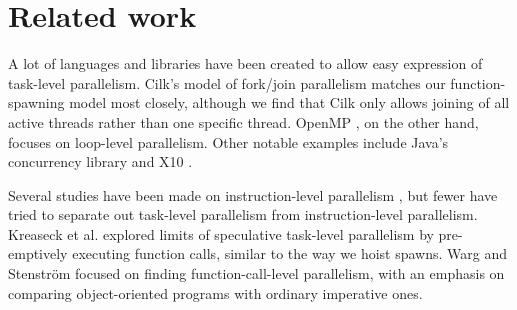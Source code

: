 \section{Related work}

A lot of languages and libraries have been created to allow easy expression of task-level parallelism.
Cilk's \cite{blumofe96cilk} model of fork/join parallelism matches our function-spawning model most closely, although we find that Cilk only allows joining of all active threads rather than one specific thread.
OpenMP \cite{dagum98openmp}, on the other hand, focuses on loop-level parallelism.
Other notable examples include Java's concurrency library \cite{lea00java} and  X10 \cite{charles05x10}.

Several studies have been made on instruction-level parallelism \cite{wall91limits, postiff99limits, austin92dynamic, lam92limits, mak09limits}, but fewer have tried to separate out task-level parallelism from instruction-level parallelism.
Kreaseck et al. \cite{Kreaseck00limitsof} explored limits of speculative task-level parallelism by pre-emptively executing function calls, similar to the way we hoist spawns.
Warg and Stenstr\"{o}m \cite{warg01limits} focused on finding function-call-level parallelism, with an emphasis on comparing object-oriented programs with ordinary imperative ones.



